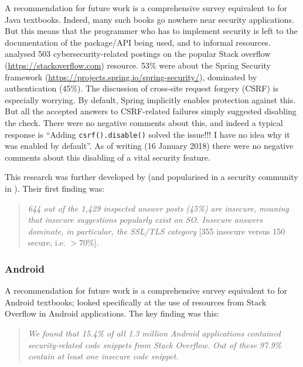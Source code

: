 \documentclass[conference]{IEEEtran}
\begin{document}
A recommendation for future work is a comprehensive survey equivalent to \cite{Drop2019} for  Java textbooks. Indeed, many such books go nowhere near security applications.  But this means that the programmer who has to implement security is left to the documentation of the package/API being used, and to informal resources. \cite{Mengetal2018a} analysed 503 cybersecurity-related postings on the popular Stack overflow (\url{https://stackoverflow.com}) resource.  53\% were about the Spring Security framework (\url{https://projects.spring.io/spring-security/}), dominated by authentication (45\%). The discussion \cite[\S4.3.1]{Mengetal2018a} of cross-site request forgery (CSRF) is especially worrying.  By default, Spring implicitly enables protection against this. But all the accepted answers to CSRF-related failures simply suggested disabling the check. There were no negative comments about this, and indeed a typical response is ``Adding \verb!csrf().disable()!
solved the issue!!! I have no idea why it was enabled by default''. As of writing (16 January 2018) there were no negative comments about this disabling of a vital security feature.
\par
This research was further developed by \cite{Chenetal2019a}  (and popularised in a security community in \cite{Zorz2019a}). Their first finding was:

\begin{quote}
{\emph{644 out of the 1,429 inspected answer posts
(45\%) are insecure, meaning that insecure suggestions
popularly exist on SO. Insecure answers dominate, in
particular, the SSL/TLS category}} [355 insecure versus 150 secure, i.e. $>70$\%].
\end{quote} 

\subsubsection{Android}\label{sec:Android}

A recommendation for future work is a comprehensive survey equivalent to \cite{Drop2019} for Android textbooks; \cite{Fischeretal2017a} looked specifically at the use of resources from Stack Overflow in Android applications. The key finding was this:
\begin{quote}
{\emph{We found that 15.4\% of all 1.3 million Android applications
contained security-related code snippets from
Stack Overflow. Out of these 97.9\% contain at least one
insecure code snippet.}}
\end{quote}
\end{document}
